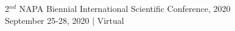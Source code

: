 \documentclass[dvipsnames,usenames]{beamer}
\begin{document}
\begin{frame}[plain,t]{\vskip2mm
2$^{nd}$ NAPA Biennial International Scientific Conference, 2020 \\[1cm]
September 25-28, 2020 | Virtual \\[1cm]}
\begin{block}
\end{block}
\end{frame}
\end{document}
